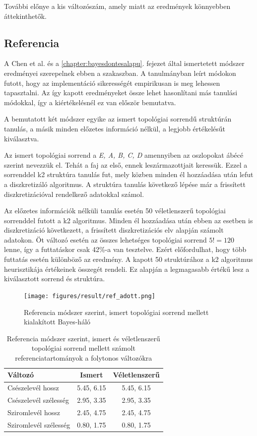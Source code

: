 További előnye a kis változószám, amely miatt az eredmények könnyebben áttekinthetők.

\subsection{Referencia}
A Chen et al. \cite{chen2017learning} és a \ref{chapter:bayesdontesalapu}. fejezet által ismertetett módszer eredményei szerepelnek ebben a szakaszban. A tanulmányban leírt módokon futott, hogy az implementáció sikerességét empirikusan is meg lehessen tapasztalni. Az így kapott eredményeket össze lehet hasonlítani más tanulási módokkal, így a kiértékelésnél ez van először bemutatva.

A bemutatott két módszer egyike az ismert topológiai sorrendű struktúrán tanulás, a másik minden előzetes információ nélkül, a legjobb értékelésűt kiválasztva.

Az ismert topológiai sorrend a \emph{E, A, B, C, D} amennyiben az oszlopokat ábécé szerint nevezzük el. Tehát a faj az első, ennek leszármazottjait keressük. Ezzel a sorrenddel k2 struktúra tanulás fut, mely közben minden él hozzáadása után lefut a diszkretizáló algoritmus. A struktúra tanulás következő lépése már a frissített diszkretizációval rendelkező adatokkal számol.

Az előzetes információk nélküli tanulás esetén 50 véletlenszerű topológiai sorrenddel futott a k2 algoritmus. Minden él hozzáadása után ebben az esetben is diszkretizáció következett, a frissített diszkretizációs elv alapján számolt adatokon. Öt változó esetén az összes lehetséges topológiai sorrend $5! = 120$ lenne, így a futtatáskor csak 42\%-a van tesztelve. Ezért előfordulhat, hogy több futtatás esetén különböző az eredmény. A kapott 50 struktúrához a k2 algoritmus heurisztikája értékeinek összegét rendeli. Ez alapján a legmagasabb értékű lesz a kiválasztott sorrend és struktúra.

\begin{figure}[htp]
    \centering
    \texttt{[image: figures/result/ref\_adott.png]}
    \caption{Referencia módszer szerint, ismert topológiai sorrend mellett kialakított Bayes-háló}
    \label{fig:eredmeny-referencia-ismert}
\end{figure}

\begin{table}[htp]\centering
    \begin{tabular}{lcc}
    Változó               & Ismert     & Véletlenszerű \\ \hline
    Csészelevél hossz     & 5.45, 6.15 & 5.45, 6.15   \\
    Csészelevél szélesség & 2.95, 3.35 & 2.95, 3.35   \\
    Sziromlevél hossz     & 2.45, 4.75 & 2.45, 4.75   \\
    Sziromlevél szélesség & 0.80, 1.75 & 0.80, 1.75
    \end{tabular}
    \caption{Referencia módszer szerint, ismert és véletlenszerű topológiai sorrend mellett számolt referenciatartományok a folytonos változókra}
    \label{tab:eredmeny-referencia}
\end{table}

